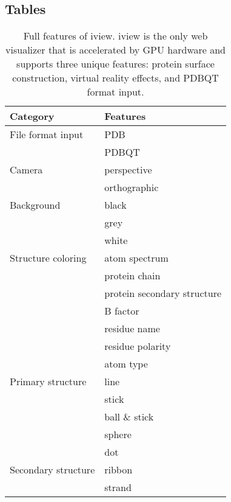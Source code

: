 \documentclass[twocolumn]{bmcart}%
\begin{document}
\begin{backmatter}

\section*{Tables}
\begin{table}[h!]
\caption{Full features of iview. iview is the only web visualizer that is accelerated by GPU hardware and supports three unique features: protein surface construction, virtual reality effects, and PDBQT format input.}\label{tbl:features}
      \begin{tabular}{ll}
        \hline
                 Category & Features\\
        \hline
        File format input & PDB\\
                          & PDBQT\\
        \hline
                   Camera & perspective\\
                          & orthographic\\
        \hline
               Background & black\\
                          & grey\\
                          & white\\
        \hline
       Structure coloring & atom spectrum\\
                          & protein chain\\
                          & protein secondary structure\\
                          & B factor\\
                          & residue name\\
                          & residue polarity\\
                          & atom type\\
        \hline
        Primary structure & line\\
                          & stick\\
                          & ball \& stick\\
                          & sphere\\
                          & dot\\
        \hline
      Secondary structure & ribbon\\
                          & strand\\

\end{tabular}
\end{table}
\end{backmatter}
\end{document}
